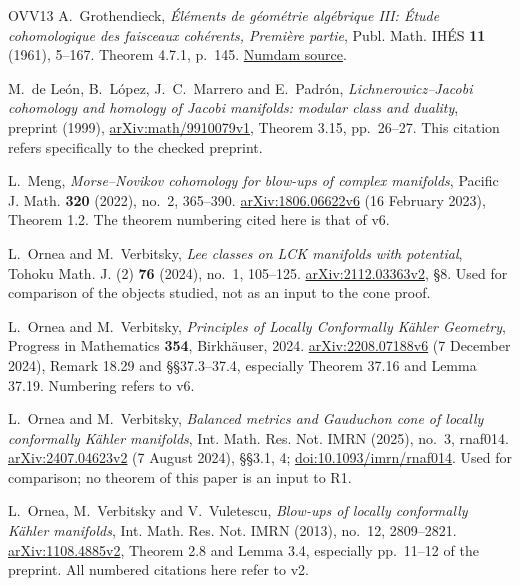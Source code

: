 \documentclass[12pt]{amsart}
\theoremstyle{definition}
\theoremstyle{remark}
\numberwithin{equation}{section}
\begin{document}
\clearpage

\begin{thebibliography}{OVV13}
A.~Grothendieck, \emph{\'El\'ements de g\'eom\'etrie alg\'ebrique III: \'Etude cohomologique des faisceaux coh\'erents, Premi\`ere partie}, Publ. Math. IH\'ES \textbf{11} (1961), 5--167. Theorem 4.7.1, p.~145.
\href{https://www.numdam.org/item/PMIHES_1961__11__5_0/}{Numdam source}.

M.~de Le\'on, B.~L\'opez, J.~C.~Marrero and E.~Padr\'on,
\emph{Lichnerowicz--Jacobi cohomology and homology of Jacobi manifolds: modular class and duality}, preprint (1999),
\href{https://arxiv.org/abs/math/9910079}{arXiv:math/9910079v1}, Theorem 3.15, pp.~26--27. This citation refers specifically to the checked preprint.

L.~Meng, \emph{Morse--Novikov cohomology for blow-ups of complex manifolds}, Pacific J. Math. \textbf{320} (2022), no.~2, 365--390.
\href{https://arxiv.org/abs/1806.06622}{arXiv:1806.06622v6} (16 February 2023), Theorem 1.2. The theorem numbering cited here is that of v6.

L.~Ornea and M.~Verbitsky, \emph{Lee classes on LCK manifolds with potential}, Tohoku Math. J. (2) \textbf{76} (2024), no.~1, 105--125.
\href{https://arxiv.org/abs/2112.03363}{arXiv:2112.03363v2}, \S8. Used for comparison of the objects studied, not as an input to the cone proof.

L.~Ornea and M.~Verbitsky, \emph{Principles of Locally Conformally K\"ahler Geometry}, Progress in Mathematics \textbf{354}, Birkh\"auser, 2024.
\href{https://arxiv.org/abs/2208.07188}{arXiv:2208.07188v6} (7 December 2024), Remark 18.29 and \S\S37.3--37.4, especially Theorem 37.16 and Lemma 37.19. Numbering refers to v6.

L.~Ornea and M.~Verbitsky, \emph{Balanced metrics and Gauduchon cone of locally conformally K\"ahler manifolds},
Int. Math. Res. Not. IMRN (2025), no.~3, rnaf014.
\href{https://arxiv.org/abs/2407.04623}{arXiv:2407.04623v2} (7 August 2024), \S\S3.1, 4;
\href{https://doi.org/10.1093/imrn/rnaf014}{doi:10.1093/imrn/rnaf014}. Used for comparison; no theorem of this paper is an input to R1.

L.~Ornea, M.~Verbitsky and V.~Vuletescu, \emph{Blow-ups of locally conformally K\"ahler manifolds}, Int. Math. Res. Not. IMRN (2013), no.~12, 2809--2821.
\href{https://arxiv.org/abs/1108.4885}{arXiv:1108.4885v2}, Theorem 2.8 and Lemma 3.4, especially pp.~11--12 of the preprint. All numbered citations here refer to v2.


\end{thebibliography}
\end{document}
